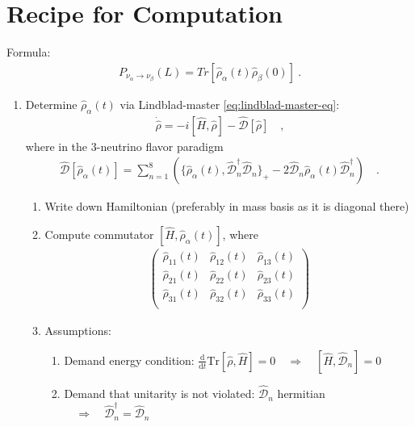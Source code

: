 \section{Recipe for Computation}
\label{sec:qd_recipe}
Formula:
%
\begin{align} \label{eq:open_sys_osc_prob2}
    P_{\nu_\alpha\rightarrow \nu_\beta}(L) = Tr[\hat{\rho}_\alpha(t)\hat{\rho}_\beta(0)] \ .
\end{align}
%
\begin{enumerate}
    \item Determine $\hat{\rho}_\alpha(t)$ via Lindblad-master \cref{eq:lindblad-master-eq}:
%
    \begin{align}
        \dot{\hat{\rho}} = -i[\hat{H},\hat{\rho}] - \hat{\mathcal{D}}[\hat{\rho}] \quad \text{,}
    \end{align}
%
    where in the $3$-neutrino flavor paradigm
%
    \begin{align} \label{eq:decoherence_operator_appendix}
        \hat{\mathcal{D}}[\hat{\rho}_\alpha(t)] 
        =
        \sum_{n=1}^8\left( \{ \hat{\rho}_\alpha(t) , \hat{\mathcal{D}}_n^\dagger \hat{\mathcal{D}}_n \}_+ - 2 \hat{\mathcal{D}}_n \hat{\rho}_\alpha(t) \hat{\mathcal{D}}_n^\dagger \right)
        \quad \text{.}
    \end{align}
%
    \begin{enumerate}
        \item Write down Hamiltonian (preferably in mass basis as it is diagonal there)
        \item Compute commutator $[\hat{H},\hat{\rho}_\alpha(t)]$, where 
%
    \begin{align} \label{eq:density_matrix_components}
        \begin{pmatrix}
            \hat{\rho}_{11}(t) & \hat{\rho}_{12}(t) & \hat{\rho}_{13}(t) \\
            \hat{\rho}_{21}(t) & \hat{\rho}_{22}(t) & \hat{\rho}_{23}(t) \\
            \hat{\rho}_{31}(t) & \hat{\rho}_{32}(t) & \hat{\rho}_{33}(t) \\
        \end{pmatrix}
    \end{align}
%
    \item Assumptions:
    \begin{enumerate}
        \item Demand energy condition: $\frac{\text{d}}{\text{d}t}\text{Tr}[\hat{\rho},\hat{H}] = 0 \quad \Longrightarrow \quad [\hat{H},\hat{\mathcal{D}}_n] = 0$
        \item Demand that unitarity is not violated: $\hat{\mathcal{D}}_n$ hermitian $\quad \Longrightarrow \quad \hat{\mathcal{D}}^\dagger_n = \hat{\mathcal{D}}_n$ 

\end{enumerate}
\end{enumerate}
\end{enumerate}
